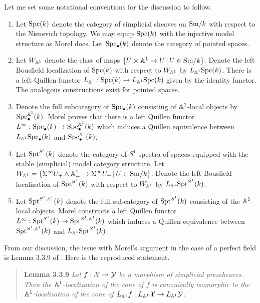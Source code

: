 \documentclass{amsart}%
\begin{document}
Let me set some notational conventions for the discussion to follow.
\begin{enumerate}
    \item Let $\mathrm{Spc}(k)$ denote the category of simplicial sheaves on
  $\mathrm{Sm}/k$ with respect to the Nisnevich topology. We may equip
  $\mathrm{Spc}(k)$ with the injective model structure as Morel does. Let
  $\mathrm{Spc}_{\bullet}(k)$ denote the category of pointed spaces. 
    \item Let $W_{\mathbb{A}^1}$ denote the class of maps
  $\{ U \times \mathbb{A}^1 \to U \, \vert \, U \in \mathrm{Sm}/k\}$. Denote the left
  Bousfield localization of $\mathrm{Spc}(k)$ with respect to $W_{\mathbb{A}^1}$ by
  $L_{\mathbb{A}^1}\mathrm{Spc}(k)$. There is a left Quillen functor
  $L_{\mathbb{A}^1} : \mathrm{Spc}(k) \to L_{\mathbb{A}^1}\mathrm{Spc}(k)$ given by the identity
  functor. The analogous constructions exist for pointed spaces. 
    \item Denote the full subcategory of $\mathrm{Spc}_{\bullet}(k)$
  consisting of $\mathbb{A}^1$-local objects by
  $\mathrm{Spc}^{\mathbb{A}^1}_{\bullet}(k)$. Morel proves that there is a left
  Quillen functor
  $L^{\infty} : \mathrm{Spc}_{\bullet}(k) \to \mathrm{Spc}_{\bullet}^{\mathbb{A}^1}(k)$
  which induces a Quillen equivalence between
  $L_{\mathbb{A}^1}\mathrm{Spc}_{\bullet}(k)$ and $\mathrm{Spc}_{\bullet}^{\mathbb{A}^1}(k)$.
    \item Let $\mathrm{Spt}^{S^1}(k)$ denote the category of $S^1$-spectra of
  spaces equipped with the stable (simplicial) model category
  structure. Let
  $W_{\mathbb{A}^1} = \{ \Sigma^{\infty}U_+ \wedge \mathbb{A}^1_+ \to
  \Sigma^{\infty} U_+ \, \vert \, U \in \mathrm{Sm}/k \}$.
  Denote the left Bousfield localization of $\mathrm{Spt}^{S^1}(k)$ with
  respect to $W_{\mathbb{A}^1}$ by $L_{\mathbb{A}^1} \mathrm{Spt}^{S^1}(k)$. 
    \item Let $\mathrm{Spt}^{S^1,\mathbb{A}^1}(k)$ denote the full subcategory of
  $\mathrm{Spt}^{S^1}(k)$ consisting of the $\mathbb{A}^1$-local objects. Morel
  constructs a left Quillen functor
  $L^{\infty} : \mathrm{Spt}^{S^1}(k) \to \mathrm{Spt}^{S^1,\mathbb{A}^1}(k)$ which induces
  a Quillen equivalence between $\mathrm{Spt}^{S^1,\mathbb{A}^1}(k)$ and
  $L_{\mathbb{A}^1}\mathrm{Spt}^{S^1}(k)$.
\end{enumerate}

From our discussion, the issue with Morel's argument in the case of a
perfect field is Lemma 3.3.9 of \cite{Mor03}. Here is the reproduced statement.

\begin{quote}
  {\bf Lemma 3.3.9} {\it Let $f: \mathcal{X} \to \mathcal{Y}$ be a morphism of simplicial
    preseheaves. Then the $\mathbb{A}^1$-localization of the cone of $f$ is
    canonically isomorphic to the $\mathbb{A}^1$-localization of the cone of
    $L_{\mathbb{A}^1}f : L_{\mathbb{A}^1}\mathcal{X} \to L_{\mathbb{A}^1}\mathcal{Y}$.}
\end{quote}
\end{document}
